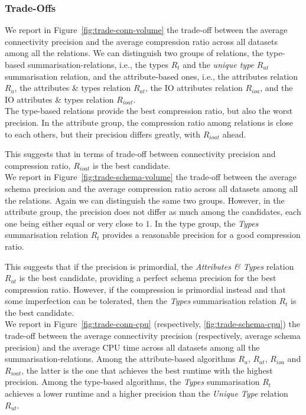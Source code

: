 \subsubsection{Trade-Offs}

We report in Figure~\ref{fig:trade-conn-volume} the trade-off between the average connectivity precision and the average compression ratio across all datasets among all the relations. We can distinguish two groups of relations, the type-based \glspl{summarisation-relation}, i.e., the types $R_t$ and the \emph{unique type} $R_{ut}$ summarisation relation, and the attribute-based ones, i.e., the attributes relation $R_a$, the attributes \& types relation $R_{at}$, the IO attributes relation $R_{ioa}$, and the IO attributes \& types relation $R_{ioat}$.\\

The type-based relations provide the best compression ratio, but also the worst precision. In the attribute group, the compression ratio among relations is close to each others, but their precision differs greatly, with $R_{ioat}$ ahead.

This suggests that in terms of trade-off between connectivity precision and compression ratio, $R_{ioat}$ is the best candidate.\\

We report in Figure~\ref{fig:trade-schema-volume} the trade-off between the average schema precision and the average compression ratio across all datasets among all the relations. Again we can distinguish the same two groups. However, in the attribute group, the precision does not differ as much among the candidates, each one being either equal or very close to $1$. In the type group, the \emph{Types} summarisation relation $R_t$ provides a reasonable precision for a good compression ratio.

This suggests that if the precision is primordial, the \emph{Attributes \& Types} relation $R_{at}$ is the best candidate, providing a perfect schema precision for the best compression ratio. However, if the compression is primordial instead and that some imperfection can be tolerated, then the \emph{Types} summarisation relation $R_t$ is the best candidate.\\

We report in Figure~\ref{fig:trade-conn-cpu} (respectively, \ref{fig:trade-schema-cpu}) the trade-off between the average connectivity precision (respectively, average schema precision) and the average CPU time across all datasets among all the \glspl{summarisation-relation}. Among the attribute-based algorithms $R_a$, $R_{at}$, $R_{ioa}$ and $R_{ioat}$, the latter is the one that achieves the best runtime with the highest precision. Among the type-based algorithms, the \emph{Types} summarisation $R_t$ achieves a lower runtime and a higher precision than the \emph{Unique Type} relation $R_{ut}$.

